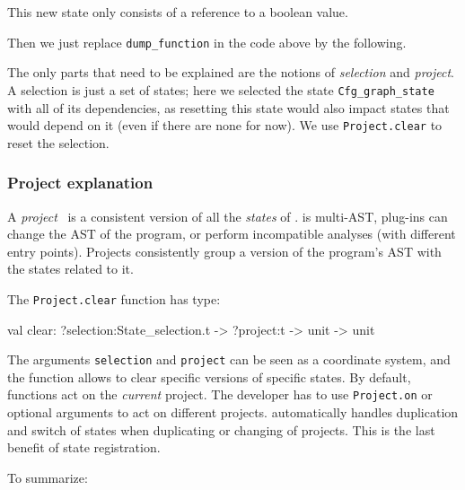 
This new state only consists of a reference to a boolean value.

Then we just replace \texttt{dump\_function} in the code above by the
following.


The only parts that need to be explained are the notions of
\emph{selection} and \emph{project}. A selection is just a set of
states; here we selected the state \texttt{Cfg\_graph\_state} with all
of its dependencies, as resetting this state would also impact states
that would depend on it (even if there are none for now). We use
\texttt{Project.clear} to reset the selection.

\subsubsection{Project explanation}

A \emph{project}~\cite{project} is a consistent version of all the \emph{states}
of \framac. \framac is multi-AST, \ie \framac plug-ins can change the AST of the
program, or perform incompatible analyses (\eg with different entry
points). Projects consistently group a version of the program's AST with
the states related to it.

The \texttt{Project.clear} function has type:
\begin{ocamlcode}
val clear: ?selection:State_selection.t -> ?project:t -> unit -> unit
\end{ocamlcode}

The arguments \texttt{selection} and \texttt{project} can be seen as a
coordinate system, and the function allows to clear specific versions
of specific states. By default, \framac functions act on the
\emph{current} project. The developer has to use \texttt{Project.on} or optional
arguments to act on different projects. \framac automatically handles
duplication and switch of states when duplicating or changing of
projects. This is the last benefit of state registration.

To summarize:

